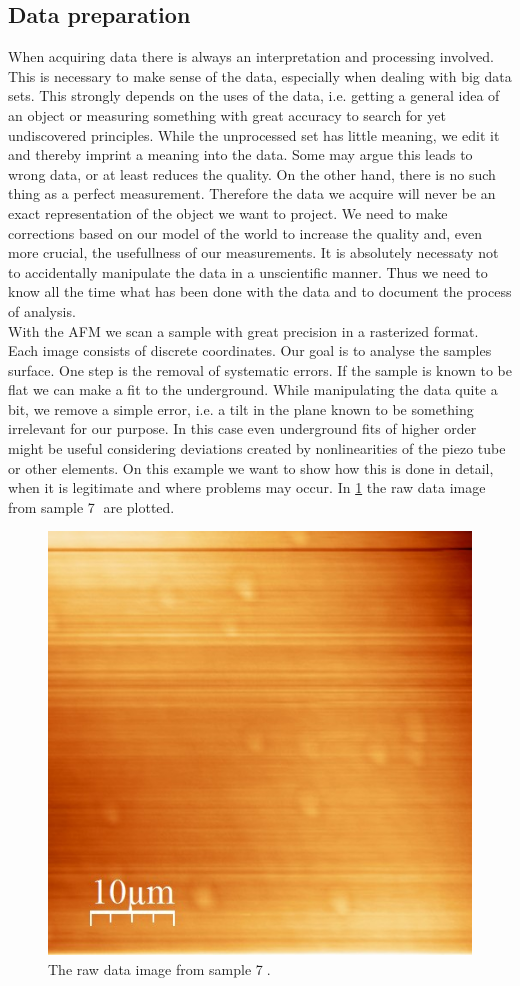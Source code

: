 \documentclass[paper=a4,fontsize=10pt,DIV=18,twocolumn,parskip=half]{scrartcl}
\numberwithin{equation}{section}    %
\begin{document}
\subsection{Data preparation}
When acquiring data there is always an interpretation and processing involved.  
This is necessary to make sense of the data, especially when dealing with big 
data sets. This strongly depends on the uses of the data, i.e. getting a general 
idea of an object or measuring something with great accuracy to search for yet 
undiscovered principles. While the unprocessed set has little meaning, we edit 
it and thereby imprint a meaning into the data. Some may argue this leads to 
wrong data, or at least reduces the quality. On the other hand, there is no such 
thing as a perfect measurement.  Therefore the data we acquire will never be an 
exact representation of the object we want to project. We need to make 
corrections based on our model of the world to increase the quality and, even 
more crucial, the usefullness of our measurements.  It is absolutely necessaty 
not to accidentally manipulate the data in a unscientific manner. Thus we need 
to know all the time what has been done with the data and to document the 
process of analysis. \\
With the AFM we scan a sample with great precision in a rasterized format. Each 
image consists of discrete coordinates. Our goal is to analyse the samples 
surface. One step is the removal of systematic errors. If the sample is known to 
be flat we can make a fit to the underground. While manipulating the data quite 
a bit, we remove a simple error, i.e. a tilt in the plane known to be something 
irrelevant for our purpose. In this case even underground fits of higher order 
might be useful considering deviations created by nonlinearities of the piezo 
tube or other elements. On this example we want to show how this is done in 
detail, when it is legitimate and where problems may occur. In \ref{rows} the 
raw data image from sample \textcircled{7} are plotted.

\begin{figure}[htp]
    \begin{center}
        \includegraphics[width=0.7\columnwidth]{Bilder/7}
        \caption{The raw data image from sample \textcircled{7}. }
        \label{rows}
    \end{center}
\end{figure}
\end{document}
